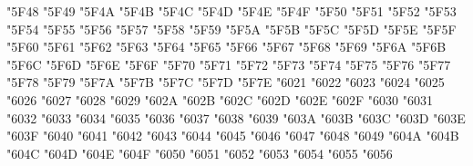 {\Uchar\jis"5F48 %
\Uchar\jis"5F49 %
\Uchar\jis"5F4A %
\Uchar\jis"5F4B %
\Uchar\jis"5F4C %
\Uchar\jis"5F4D %
\Uchar\jis"5F4E %
\Uchar\jis"5F4F %
\Uchar\jis"5F50 %
\Uchar\jis"5F51 %
\Uchar\jis"5F52 %
\Uchar\jis"5F53 %
\Uchar\jis"5F54 %
\Uchar\jis"5F55 %
\Uchar\jis"5F56 %
\Uchar\jis"5F57 %
\Uchar\jis"5F58 %
\Uchar\jis"5F59 %
\Uchar\jis"5F5A %
\Uchar\jis"5F5B %
\Uchar\jis"5F5C %
\Uchar\jis"5F5D %
\Uchar\jis"5F5E %
\Uchar\jis"5F5F %
\Uchar\jis"5F60 %
\Uchar\jis"5F61 %
\Uchar\jis"5F62 %
\Uchar\jis"5F63 %
\Uchar\jis"5F64 %
\Uchar\jis"5F65 %
\Uchar\jis"5F66 %
\Uchar\jis"5F67 %
\Uchar\jis"5F68 %
\Uchar\jis"5F69 %
\Uchar\jis"5F6A %
\Uchar\jis"5F6B %
\Uchar\jis"5F6C %
\Uchar\jis"5F6D %
\Uchar\jis"5F6E %
\Uchar\jis"5F6F %
\Uchar\jis"5F70 %
\Uchar\jis"5F71 %
\Uchar\jis"5F72 %
\Uchar\jis"5F73 %
\Uchar\jis"5F74 %
\Uchar\jis"5F75 %
\Uchar\jis"5F76 %
\Uchar\jis"5F77 %
\Uchar\jis"5F78 %
\Uchar\jis"5F79 %
\Uchar\jis"5F7A %
\Uchar\jis"5F7B %
\Uchar\jis"5F7C %
\Uchar\jis"5F7D %
\Uchar\jis"5F7E %
\Uchar\jis"6021 %
\Uchar\jis"6022 %
\Uchar\jis"6023 %
\Uchar\jis"6024 %
\Uchar\jis"6025 %
\Uchar\jis"6026 %
\Uchar\jis"6027 %
\Uchar\jis"6028 %
\Uchar\jis"6029 %
\Uchar\jis"602A %
\Uchar\jis"602B %
\Uchar\jis"602C %
\Uchar\jis"602D %
\Uchar\jis"602E %
\Uchar\jis"602F %
\Uchar\jis"6030 %
\Uchar\jis"6031 %
\Uchar\jis"6032 %
\Uchar\jis"6033 %
\Uchar\jis"6034 %
\Uchar\jis"6035 %
\Uchar\jis"6036 %
\Uchar\jis"6037 %
\Uchar\jis"6038 %
\Uchar\jis"6039 %
\Uchar\jis"603A %
\Uchar\jis"603B %
\Uchar\jis"603C %
\Uchar\jis"603D %
\Uchar\jis"603E %
\Uchar\jis"603F %
\Uchar\jis"6040 %
\Uchar\jis"6041 %
\Uchar\jis"6042 %
\Uchar\jis"6043 %
\Uchar\jis"6044 %
\Uchar\jis"6045 %
\Uchar\jis"6046 %
\Uchar\jis"6047 %
\Uchar\jis"6048 %
\Uchar\jis"6049 %
\Uchar\jis"604A %
\Uchar\jis"604B %
\Uchar\jis"604C %
\Uchar\jis"604D %
\Uchar\jis"604E %
\Uchar\jis"604F %
\Uchar\jis"6050 %
\Uchar\jis"6051 %
\Uchar\jis"6052 %
\Uchar\jis"6053 %
\Uchar\jis"6054 %
\Uchar\jis"6055 %
\Uchar\jis"6056 %
}

